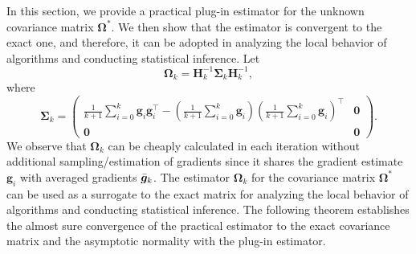 \documentclass[aos]{imsart}
\numberwithin{equation}{section}
\theoremstyle{plain}
\begin{document}
In this section, we provide a practical plug-in estimator for the unknown covariance matrix $\bm{\Omega}^{*}$. We then show that the estimator is convergent to the exact one, and therefore, it can be adopted in analyzing the local behavior of algorithms and conducting statistical inference.
Let 
\begin{equation}
    \bm{\Omega}_{k} = \bm{H}_{k}^{-1} \bm{\Sigma}_{k} \bm{H}_{k}^{-1},
\end{equation}
where 
\begin{equation*}
    \bm{\Sigma}_{k} = \left( \begin{array}{cc}
        \frac{1}{k+1}\sum_{i=0}^{k} \bm{g}_i \bm{g}_i^{\top} - \left( \frac{1}{k+1}\sum_{i=0}^{k} \bm{g}_i\right)\left( \frac{1}{k+1}\sum_{i=0}^{k} \bm{g}_i\right)^{\top} &  \bm{0}\\
         \bm{0} & \bm{0}
    \end{array}\right).
\end{equation*}
We observe that $\bm{\Omega}_k$ can be cheaply calculated in each iteration without additional sampling/estimation of gradients since it shares the gradient estimate $\bm{g}_i$ with averaged gradients $\Bar{\bm{g}}_k$.
The estimator $\bm{\Omega}_k$ for the covariance matrix $\bm{\Omega}^{*}$ can be used as a surrogate to the exact matrix for analyzing the local behavior of algorithms and conducting statistical inference.
The following theorem establishes the almost sure convergence of the practical estimator to the exact covariance matrix and the asymptotic normality with the plug-in estimator.
\end{document}
